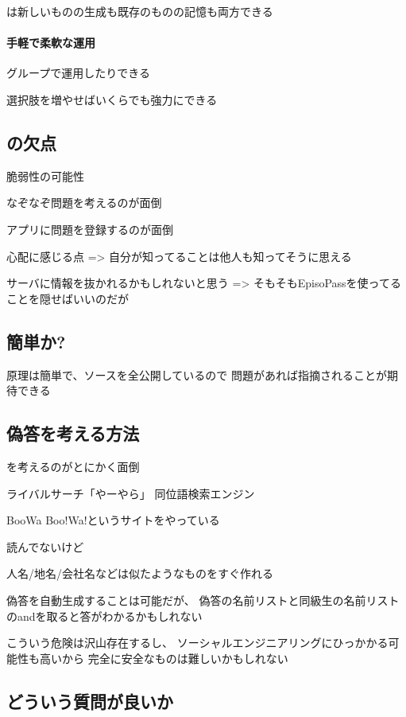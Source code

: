 \documentclass[twoside]{wiss}
\begin{document}
{\EP}は新しいものの生成も既存のものの記憶も両方できる

\paragraph{手軽で柔軟な運用}

グループで運用したりできる

選択肢を増やせばいくらでも強力にできる

\subsection{{\EP}の欠点}

脆弱性の可能性

なぞなぞ問題を考えるのが面倒

アプリに問題を登録するのが面倒

心配に感じる点
 => 自分が知ってることは他人も知ってそうに思える

サーバに情報を抜かれるかもしれないと思う
 => そもそもEpisoPassを使ってることを隠せばいいのだが

\subsection{簡単か?}

原理は簡単で、ソースを全公開しているので
問題があれば指摘されることが期待できる

\subsection{偽答を考える方法}

{\SQ}を考えるのがとにかく面倒

ライバルサーチ「やーやら」
同位語検索エンジン\cite{大島裕明:2006-12-15}

BooWa
\cite{Wang:2007:LSE:1441428.1442086}
Boo!Wa!というサイトをやっている\cite{BooWa}

\cite{Huang:2012:LFC:2426725.2426728}読んでないけど

人名/地名/会社名などは似たようなものをすぐ作れる

偽答を自動生成することは可能だが、
偽答の名前リストと同級生の名前リストのandを取ると答がわかるかもしれない

こういう危険は沢山存在するし、
ソーシャルエンジニアリング\cite{ソーシャル}にひっかかる可能性も高いから
完全に安全なものは難しいかもしれない

\subsection{どういう質問が良いか}
\end{document}
